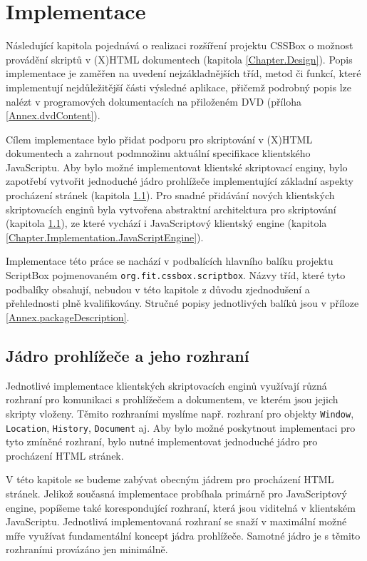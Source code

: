 \chapter{Implementace}
\label{Chapter.Implementation}

Následující kapitola pojednává o realizaci rozšíření projektu CSSBox o možnost provádění skriptů v (X)HTML dokumentech (kapitola \ref{Chapter.Design}). Popis implementace je zaměřen na uvedení nejzákladnějších tříd, metod či funkcí, které implementují nejdůležitější části výsledné aplikace, přičemž podrobný popis lze nalézt v programových dokumentacích na přiloženém DVD (příloha \ref{Annex.dvdContent}).

Cílem implementace bylo přidat podporu pro skriptování v (X)HTML dokumentech a zahrnout podmnožinu aktuální specifikace klientského JavaScriptu. Aby bylo možné implementovat klientské skriptovací enginy, bylo zapotřebí vytvořit jednoduché jádro prohlížeče implementující základní aspekty procházení stránek (kapitola \ref{Chapter.Implementation.BrowsingCore}). Pro snadné přidávání nových klientských skriptovacích enginů byla vytvořena abstraktní architektura pro skriptování (kapitola \ref{Chapter.Implementation.BrowsingCore}), ze které vychází i JavaScriptový klientský engine (kapitola \ref{Chapter.Implementation.JavaScriptEngine}).

Implementace této práce se nachází v podbalících hlavního balíku projektu ScriptBox pojmenovaném \texttt{org.fit.cssbox.scriptbox}.  Názvy tříd, které tyto podbalíky obsahují, nebudou v této kapitole z důvodu zjednodušení a přehlednosti plně kvalifikovány. Stručné popisy jednotlivých balíků jsou v příloze \ref{Annex.packageDescription}.

\section{Jádro prohlížeče a jeho rozhraní}
\label{Chapter.Implementation.BrowsingCore}

Jednotlivé implementace klientských skriptovacích enginů využívají různá rozhraní pro komunikaci s prohlížečem a dokumentem, ve kterém jsou jejich skripty vloženy. Těmito rozhraními myslíme např. rozhraní pro objekty \texttt{Window}, \texttt{Location}, \texttt{History}, \texttt{Document} aj. Aby bylo možné poskytnout implementaci pro tyto zmíněné rozhraní, bylo nutné implementovat jednoduché jádro pro procházení HTML stránek.

V této kapitole se budeme zabývat obecným jádrem pro procházení HTML stránek. Jelikož současná implementace probíhala primárně pro JavaScriptový engine, popíšeme také korespondující rozhraní, která jsou viditelná v klientském JavaScriptu. Jednotlivá implementovaná rozhraní se snaží v maximální možné míře využívat fundamentální koncept jádra prohlížeče. Samotné jádro je s těmito rozhraními provázáno jen minimálně.


